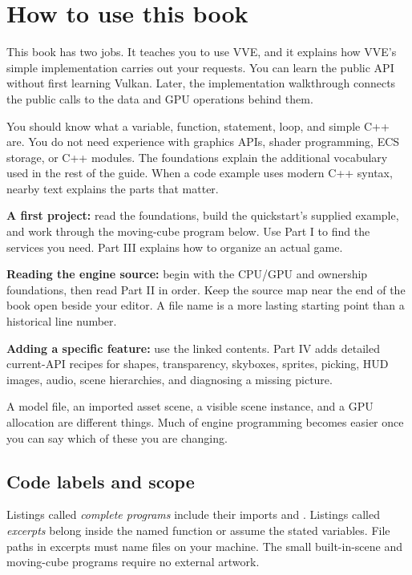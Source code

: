 \documentclass[11pt,a4paper]{article}
\begin{document}

\section*{How to use this book}
This book has two jobs. It teaches you to use VVE, and it explains how VVE's simple implementation carries out your requests. You can learn the public API without first learning Vulkan. Later, the implementation walkthrough connects the public calls to the data and GPU operations behind them.

You should know what a variable, function,  statement, loop, and simple C++  are. You do not need experience with graphics APIs, shader programming, ECS storage, or C++ modules. The foundations explain the additional vocabulary used in the rest of the guide. When a code example uses modern C++ syntax, nearby text explains the parts that matter.

\textbf{A first project:} read the foundations, build the quickstart's supplied example, and work through the moving-cube program below. Use Part I to find the services you need. Part III explains how to organize an actual game.

\textbf{Reading the engine source:} begin with the CPU/GPU and ownership foundations, then read Part II in order. Keep the source map near the end of the book open beside your editor. A file name is a more lasting starting point than a historical line number.

\textbf{Adding a specific feature:} use the linked contents. Part IV adds detailed current-API recipes for shapes, transparency, skyboxes, sprites, picking, HUD images, audio, scene hierarchies, and diagnosing a missing picture.

\begin{remember}A model file, an imported asset scene, a visible scene instance, and a GPU allocation are different things. Much of engine programming becomes easier once you can say which of these you are changing.\end{remember}

\subsection*{Code labels and scope}
Listings called \emph{complete programs} include their imports and . Listings called \emph{excerpts} belong inside the named function or assume the stated variables. File paths in excerpts must name files on your machine. The small built-in-scene and moving-cube programs require no external artwork.
\end{document}
